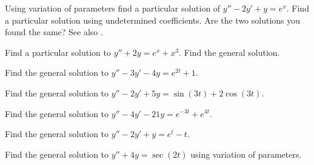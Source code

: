 \documentclass{ximera}
\begin{document}
\begin{exercise}
    \begin{tasks}
        \task Using variation of parameters find a particular solution of $y''-2y'+y = e^x$.
        \task Find a particular solution using undetermined coefficients.
        \task Are the two solutions you found the same? See also .
    \end{tasks}
\end{exercise}


\begin{exercise}%
    \begin{tasks}
        \task Find a particular solution to $y''+2y=e^x + x^3$.
        \task Find the general solution.
    \end{tasks}
\end{exercise}


\begin{exercise}
    Find the general solution to $y'' - 3y' - 4y = e^{2t} + 1$.
\end{exercise}

\begin{exercise}
    Find the general solution to $y'' - 2y' + 5y = \sin(3t) + 2\cos(3t)$.
\end{exercise}

\begin{exercise}
    Find the general solution to $y'' - 4y' - 21y = e^{-3t} + e^{4t}$.
\end{exercise}

\begin{exercise}
    Find the general solution to $y'' - 2y' + y = e^t - t$.
\end{exercise}

\begin{exercise}
    Find the general solution to $y'' + 4y = \sec(2t)$ using variation of parameters.
\end{exercise}
\end{document}
